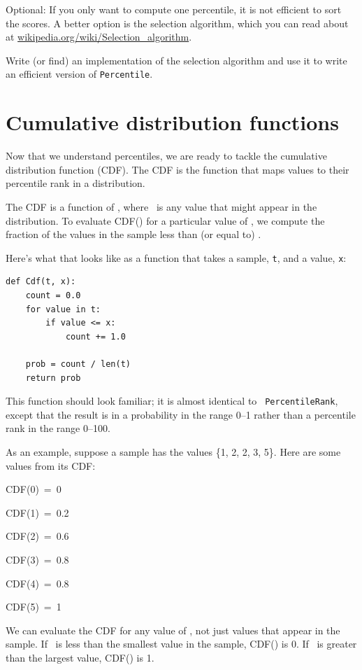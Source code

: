 \documentclass[12pt]{book}
\begin{document}
\begin{exercise}
Optional: If you only want to compute one percentile, it is not
efficient to sort the scores.  A better option is the selection
algorithm, which you can read about at
\url{wikipedia.org/wiki/Selection_algorithm}.

Write (or find) an implementation of the selection algorithm and use
it to write an efficient version of {\tt Percentile}.

\end{exercise}


\section{Cumulative distribution functions}

Now that we understand percentiles, we are ready to tackle the
cumulative distribution function (CDF).  The CDF is the function that
maps values to their percentile rank in a distribution.

The CDF is a function of \x, where \x~is any value that might appear
in the distribution.  To evaluate CDF(\x) for a particular value of
\x, we compute the fraction of the values in the sample less than (or
equal to) \x.

Here's what that looks like as a function that takes a sample,
{\tt t}, and a value, {\tt x}:
%
\begin{verbatim}
def Cdf(t, x):
    count = 0.0
    for value in t:
        if value <= x:
            count += 1.0

    prob = count / len(t)
    return prob
\end{verbatim}

This function should look familiar; it is almost identical to {\tt
  PercentileRank}, except that the result is in a probability in the
range 0--1 rather than a percentile rank in the range 0--100.

As an example, suppose a sample has the values \{1, 2, 2, 3, 5\}.
Here are some values from its CDF:

\quad CDF(0)~=~0

\quad CDF(1)~=~0.2

\quad CDF(2)~=~0.6

\quad CDF(3)~=~0.8

\quad CDF(4)~=~0.8

\quad CDF(5)~=~1

We can evaluate the CDF for any value of \x, not just
values that appear in the sample.
If \x~is less than the smallest value in the sample, CDF(\x) is 0.
If \x~is greater than the largest value, CDF(\x) is 1.
\end{document}

